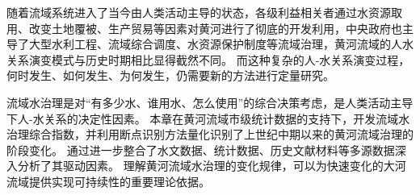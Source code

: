 随着流域系统进入了当今由人类活动主导的状态，各级利益相关者通过水资源取用、改变土地覆被、生产贸易等因素对黄河进行了彻底的开发利用，中央政府也主导了大型水利工程、流域综合调度、水资源保护制度等流域治理，黄河流域的人水关系演变模式与历史时期相比显得截然不同。
而这种复杂的人-水关系演变过程，何时发生、如何发生、为何发生，仍需要新的方法进行定量研究。

流域水治理是对“有多少水、谁用水、怎么使用”的综合决策考虑，是人类活动主导下人-水关系的决定性因素。
本章在黄河流域市级统计数据的支持下，开发流域水治理综合指数，并利用断点识别方法量化识别了上世纪中期以来的黄河流域治理的阶段变化。
通过进一步整合了水文数据、统计数据、历史文献材料等多源数据深入分析了其驱动因素。
理解黄河流域水治理的变化规律，可以为快速变化的大河流域提供实现可持续性的重要理论依据。
